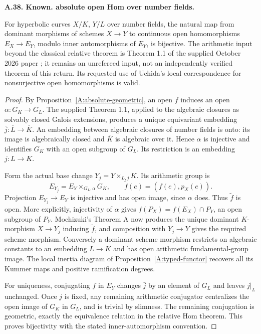 \documentclass[11pt,oneside]{article}
\makeatletter
\newcounter{statementanchor}
\newenvironment{statement}[3]{%
 \refstepcounter{statementanchor}\def\@currentlabel{#1}%
 \par\addvspace{9pt}\noindent
 \textbf{#1. #2. #3.}\par\nobreak\noindent\ignorespaces
}{\par\addvspace{5pt}}
\makeatother
\begin{document}
\begin{statement}{A.38}{Known}{absolute open Hom over number fields}
\label{st:A.38}
\label{A:absolute-hom}
For hyperbolic curves $X/K$, $Y/L$ over number fields, the
natural map from dominant morphisms of schemes $X\to Y$ to
continuous open homomorphisms $E_X\to E_Y$, modulo inner
automorphisms of $E_Y$, is bijective. The arithmetic input
beyond the classical relative theorem is Theorem 1.1 of the
supplied October 2026 paper \cite{A_OpenAI2026Hom}; it remains
an unrefereed input, not an independently verified theorem
of this return. Its requested use of Uchida's local
correspondence for nonsurjective open homomorphisms is valid.
\end{statement}
\begin{proof}
By Proposition~\ref{A:absolute-geometric}, an open $f$ induces
an open $\alpha:G_K\to G_L$. The supplied Theorem 1.1,
applied to the algebraic closures as solvably closed Galois
extensions, produces a unique equivariant embedding
$\bar j:\overline L\to\overline K$. An embedding between
algebraic closures of number fields is onto: its image is
algebraically closed and $\overline K$ is algebraic over it.
Hence $\alpha$ is injective and identifies $G_K$ with an
open subgroup of $G_L$. Its restriction is an embedding
$j:L\to K$.

Form the actual base change $Y_j=Y\times_{L,j}K$. Its
arithmetic group is
\[
 E_{Y_j}=E_Y\times_{G_L,\alpha}G_K,
 \qquad
 \widetilde f(e)=(f(e),p_X(e)).
\]
Projection $E_{Y_j}\to E_Y$ is injective and has open image,
since $\alpha$ does. Thus $\widetilde f$ is open. More
explicitly, injectivity of $\alpha$ gives
$f(P_X)=f(E_X)\cap P_Y$, an open subgroup of $P_Y$.
Mochizuki's Theorem A \cite{A_Mochizuki1999} now produces the
unique dominant $K$-morphism $X\to Y_j$ inducing
$\widetilde f$, and composition with $Y_j\to Y$ gives the
required scheme morphism. Conversely a dominant scheme
morphism restricts on algebraic constants to an embedding
$L\to K$ and has open arithmetic fundamental-group image.
The local inertia diagram of Proposition~\ref{A:typed-functor}
recovers all its Kummer maps and positive ramification degrees.

For uniqueness, conjugating $f$ in $E_Y$ changes $\bar j$
by an element of $G_L$ and leaves $j|_L$ unchanged. Once $j$
is fixed, any remaining arithmetic conjugator centralizes the
open image of $G_K$ in $G_L$, and is trivial by slimness.
The remaining conjugation is geometric, exactly the equivalence
relation in the relative Hom theorem. This proves bijectivity
with the stated inner-automorphism convention.


\end{proof}
\end{document}
